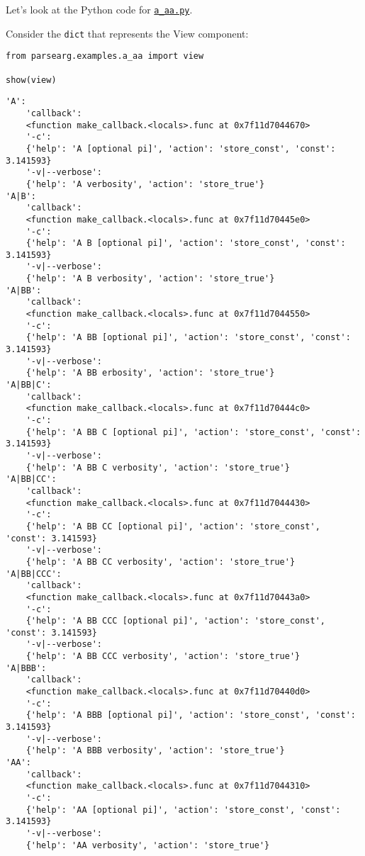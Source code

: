 \documentclass[10pt]{amsart}
\numberwithin{equation}{section}
\begin{document}
Let's look at the Python code for \href{https://github.com/tharte/parsearg/blob/master/parsearg/examples/a\_aa.py}{\texttt{a\_aa.py}}.

Consider the \texttt{dict} that represents the View component:
\begin{verbatim}
from parsearg.examples.a_aa import view

show(view)
\end{verbatim}

\begin{verbatim}
'A':
    'callback':
    <function make_callback.<locals>.func at 0x7f11d7044670>
    '-c':
    {'help': 'A [optional pi]', 'action': 'store_const', 'const': 3.141593}
    '-v|--verbose':
    {'help': 'A verbosity', 'action': 'store_true'}
'A|B':
    'callback':
    <function make_callback.<locals>.func at 0x7f11d70445e0>
    '-c':
    {'help': 'A B [optional pi]', 'action': 'store_const', 'const': 3.141593}
    '-v|--verbose':
    {'help': 'A B verbosity', 'action': 'store_true'}
'A|BB':
    'callback':
    <function make_callback.<locals>.func at 0x7f11d7044550>
    '-c':
    {'help': 'A BB [optional pi]', 'action': 'store_const', 'const': 3.141593}
    '-v|--verbose':
    {'help': 'A BB erbosity', 'action': 'store_true'}
'A|BB|C':
    'callback':
    <function make_callback.<locals>.func at 0x7f11d70444c0>
    '-c':
    {'help': 'A BB C [optional pi]', 'action': 'store_const', 'const': 3.141593}
    '-v|--verbose':
    {'help': 'A BB C verbosity', 'action': 'store_true'}
'A|BB|CC':
    'callback':
    <function make_callback.<locals>.func at 0x7f11d7044430>
    '-c':
    {'help': 'A BB CC [optional pi]', 'action': 'store_const', 'const': 3.141593}
    '-v|--verbose':
    {'help': 'A BB CC verbosity', 'action': 'store_true'}
'A|BB|CCC':
    'callback':
    <function make_callback.<locals>.func at 0x7f11d70443a0>
    '-c':
    {'help': 'A BB CCC [optional pi]', 'action': 'store_const', 'const': 3.141593}
    '-v|--verbose':
    {'help': 'A BB CCC verbosity', 'action': 'store_true'}
'A|BBB':
    'callback':
    <function make_callback.<locals>.func at 0x7f11d70440d0>
    '-c':
    {'help': 'A BBB [optional pi]', 'action': 'store_const', 'const': 3.141593}
    '-v|--verbose':
    {'help': 'A BBB verbosity', 'action': 'store_true'}
'AA':
    'callback':
    <function make_callback.<locals>.func at 0x7f11d7044310>
    '-c':
    {'help': 'AA [optional pi]', 'action': 'store_const', 'const': 3.141593}
    '-v|--verbose':
    {'help': 'AA verbosity', 'action': 'store_true'}

\end{verbatim}
\end{document}
